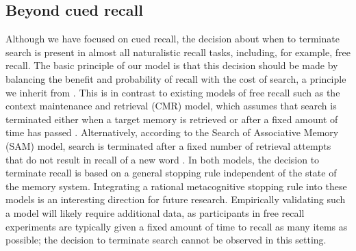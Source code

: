 \subsection{Beyond cued recall}

Although we have focused on cued recall, the decision about when to terminate search is present in almost all naturalistic recall tasks, including, for example, free recall. The basic principle of our model is that this decision should be made by balancing the benefit and probability of recall with the cost of search, a principle we inherit from \citet{anderson1989human}. This is in contrast to existing models of free recall such as the context maintenance and retrieval (CMR) model, which assumes that search is terminated either when a target memory is retrieved or after a fixed amount of time has passed \citep{polyn2009context,lohnas2015expanding}. Alternatively, according to the Search of Associative Memory (SAM) model, search is terminated after a fixed number of retrieval attempts that do not result in recall of a new word \citep{raaijmakers1981search}. In both models, the decision to terminate recall is based on a general stopping rule independent of the state of the memory system. Integrating a rational metacognitive stopping rule into these models is an interesting direction for future research. Empirically validating such a model will likely require additional data, as participants in free recall experiments are typically given a fixed amount of time to recall as many items as possible; the decision to terminate search cannot be observed in this setting.




